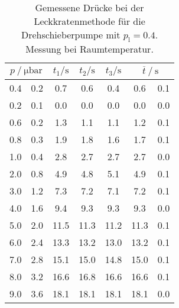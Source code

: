 \begin{table} 
\centering 
\caption{Gemessene Drücke bei der Leckkratenmethode für die Drehschieberpumpe mit $p_{\mathrm{l}}=0.4$. Messung bei Raumtemperatur.} 
\label{tab: leck_turbo_leck_0.4.pdf} 
\begin{tabular}{S[table-format=1.1]@{${}\pm{}$} S[table-format=1.1] S S S S[table-format=1.1]@{${}\pm{}$} S[table-format=1.1] } 
\toprule  
{} & {$t_1 / \si{ \second}$} & {$t_2 / \si{ \second}$} & {$t_3 / \si{ \second}$} &  \\ 
 & 0.2 & 0.7 & 0.6 & 0.4 & 0.6 & 0.1\\ 
0.2 & 0.1 & 0.0 & 0.0 & 0.0 & 0.0 & 0.0\\ 
0.6 & 0.2 & 1.3 & 1.1 & 1.1 & 1.2 & 0.1\\ 
0.8 & 0.3 & 1.9 & 1.8 & 1.6 & 1.7 & 0.1\\ 
1.0 & 0.4 & 2.8 & 2.7 & 2.7 & 2.7 & 0.0\\ 
2.0 & 0.8 & 4.9 & 4.8 & 5.1 & 4.9 & 0.1\\ 
3.0 & 1.2 & 7.3 & 7.2 & 7.1 & 7.2 & 0.1\\ 
4.0 & 1.6 & 9.4 & 9.3 & 9.3 & 9.3 & 0.0\\ 
5.0 & 2.0 & 11.5 & 11.3 & 11.2 & 11.3 & 0.1\\ 
6.0 & 2.4 & 13.3 & 13.2 & 13.0 & 13.2 & 0.1\\ 
7.0 & 2.8 & 15.1 & 15.0 & 14.8 & 15.0 & 0.1\\ 
8.0 & 3.2 & 16.6 & 16.8 & 16.6 & 16.6 & 0.1\\ 
9.0 & 3.6 & 18.1 & 18.1 & 18.1 & 18.1 & 0.0\\ 
\bottomrule 
\end{tabular} 
\end{table}